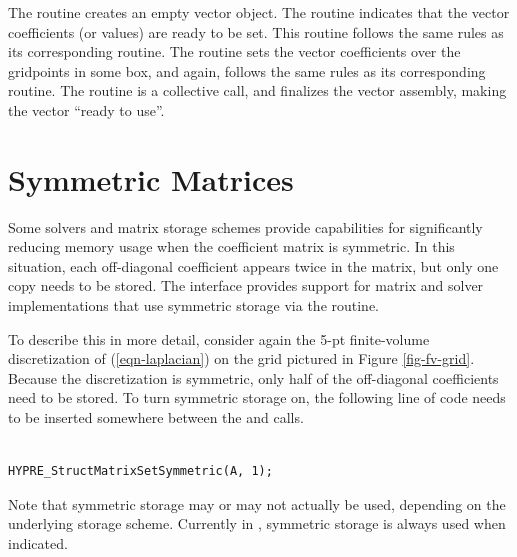 The  routine creates an empty vector object.  The
 routine indicates that the vector coefficients
(or values) are ready to be set.  This routine follows the same rules
as its corresponding  routine.  The 
routine sets the vector coefficients over the gridpoints in some box,
and again, follows the same rules as its corresponding 
routine.  The  routine is a collective call, and
finalizes the vector assembly, making the vector ``ready to use''.


\section{Symmetric Matrices}
\label{Symmetric Matrices}

Some solvers and matrix storage schemes provide capabilities for
significantly reducing memory usage when the coefficient matrix is
symmetric.  In this situation, each off-diagonal coefficient appears
twice in the matrix, but only one copy needs to be stored.  The
 interface provides support for matrix and solver
implementations that use symmetric storage via the
 routine.

To describe this in more detail, consider again the 5-pt finite-volume
discretization of (\ref{eqn-laplacian}) on the grid pictured in Figure
\ref{fig-fv-grid}.  Because the discretization is symmetric, only half
of the off-diagonal coefficients need to be stored.  To turn symmetric
storage on, the following line of code needs to be inserted somewhere
between the  and  calls.
\begin{display}
\begin{verbatim}

HYPRE_StructMatrixSetSymmetric(A, 1);

\end{verbatim}
\end{display}
Note that symmetric storage may or may not actually be used, depending
on the underlying storage scheme.  Currently in \hypre{}, symmetric
storage is always used when indicated.

